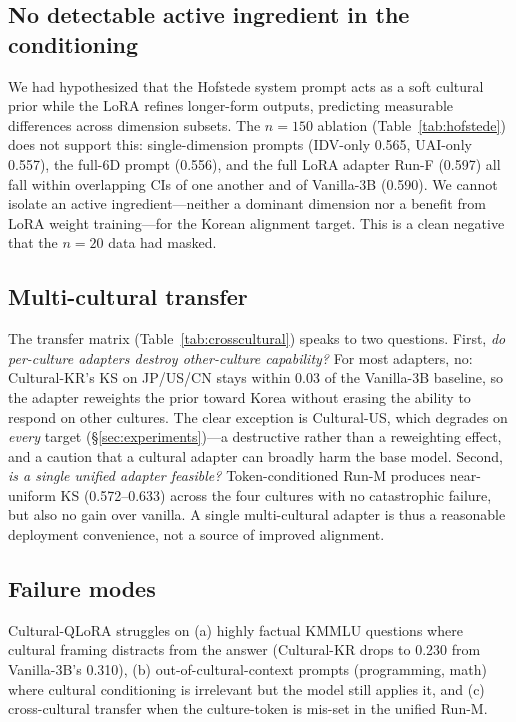 \documentclass{article}
\begin{document}
\subsection{No detectable active ingredient in the conditioning}
We had hypothesized that the Hofstede system prompt acts as a soft cultural prior while the LoRA refines longer-form outputs, predicting measurable differences across dimension subsets. The $n=150$ ablation (Table~\ref{tab:hofstede}) does not support this: single-dimension prompts (IDV-only 0.565, UAI-only 0.557), the full-6D prompt (0.556), and the full LoRA adapter Run-F (0.597) all fall within overlapping CIs of one another and of Vanilla-3B (0.590). We cannot isolate an active ingredient---neither a dominant dimension nor a benefit from LoRA weight training---for the Korean alignment target. This is a clean negative that the $n=20$ data had masked.

\subsection{Multi-cultural transfer}
The transfer matrix (Table~\ref{tab:crosscultural}) speaks to two questions. First, \emph{do per-culture adapters destroy other-culture capability?} For most adapters, no: Cultural-KR's KS on JP/US/CN stays within 0.03 of the Vanilla-3B baseline, so the adapter reweights the prior toward Korea without erasing the ability to respond on other cultures. The clear exception is Cultural-US, which degrades on \emph{every} target (\S\ref{sec:experiments})---a destructive rather than a reweighting effect, and a caution that a cultural adapter can broadly harm the base model. Second, \emph{is a single unified adapter feasible?} Token-conditioned Run-M produces near-uniform KS (0.572--0.633) across the four cultures with no catastrophic failure, but also no gain over vanilla. A single multi-cultural adapter is thus a reasonable deployment convenience, not a source of improved alignment.

\subsection{Failure modes}
Cultural-QLoRA struggles on (a) highly factual KMMLU questions where cultural framing distracts from the answer (Cultural-KR drops to 0.230 from Vanilla-3B's 0.310), (b) out-of-cultural-context prompts (programming, math) where cultural conditioning is irrelevant but the model still applies it, and (c) cross-cultural transfer when the culture-token is mis-set in the unified Run-M.
\end{document}
